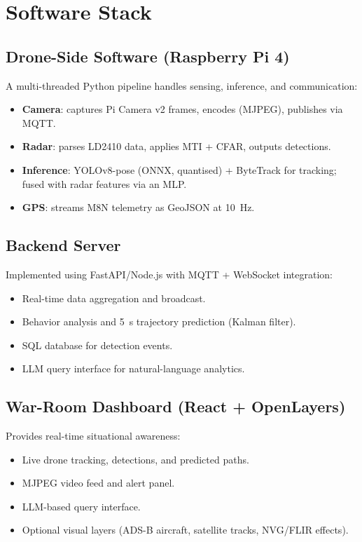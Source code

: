 \section{Software Stack}

\subsection{Drone-Side Software (Raspberry Pi 4)}
A multi-threaded Python pipeline handles sensing, inference, and communication:
\begin{itemize}
    \item \textbf{Camera}: captures Pi Camera v2 frames, encodes (MJPEG), publishes via MQTT.
    \item \textbf{Radar}: parses LD2410 data, applies MTI + CFAR, outputs detections.
    \item \textbf{Inference}: YOLOv8-pose (ONNX, quantised) + ByteTrack for tracking; fused with radar features via an MLP.
    \item \textbf{GPS}: streams M8N telemetry as GeoJSON at 10~Hz.
\end{itemize}

\subsection{Backend Server}
Implemented using FastAPI/Node.js with MQTT + WebSocket integration:
\begin{itemize}
    \item Real-time data aggregation and broadcast.
    \item Behavior analysis and 5~s trajectory prediction (Kalman filter).
    \item SQL database for detection events.
    \item LLM query interface for natural-language analytics.
\end{itemize}

\subsection{War-Room Dashboard (React + OpenLayers)}
Provides real-time situational awareness:
\begin{itemize}
    \item Live drone tracking, detections, and predicted paths.
    \item MJPEG video feed and alert panel.
    \item LLM-based query interface.
    \item Optional visual layers (ADS-B aircraft, satellite tracks, NVG/FLIR effects).
\end{itemize}

